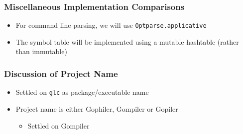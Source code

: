 \documentclass[11pt]{article}
\begin{document}
\subsubsection{Miscellaneous Implementation Comparisons}
\label{sec:orgf3a9dc3}
\begin{itemize}
\item For command line parsing, we will use \texttt{Optparse.applicative}
\item The symbol table will be implemented using a mutable hashtable
(rather than immutable)
\end{itemize}
\subsubsection{Discussion of Project Name}
\label{sec:orgdad2c16}
\begin{itemize}
\item Settled on \texttt{glc} as package/executable name
\item Project name is either Gophiler, Gompiler or Gopiler
\begin{itemize}
\item Settled on Gompiler
\end{itemize}
\end{itemize}
\end{document}
